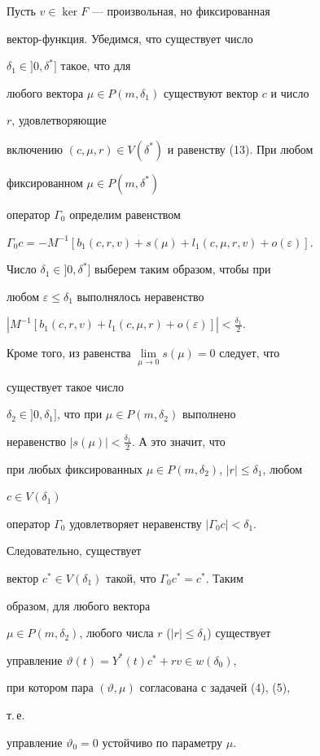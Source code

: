 \begin{pf} 


Пусть $v\in\ker F$ --- произвольная, но фиксированная 


вектор-функция. Убедимся, что существует число 


$\delta_1\in]0,\delta^*]$ такое, что для 


любого вектора $\mu\in P(m,\delta_1)$ существуют вектор $c$ и число 


$r$, удовлетворяющие 


включению $(c,\mu,r)\in V(\delta^*)$ и равенству (13). При любом 


фиксированном $\mu\in P(m,\delta^*)$ 


оператор $\Gamma_0$ определим равенством 


$\Gamma_0c=-M^{-1}[b_1(c,r,v)+s(\mu)+l_1(c,\mu,r,v)+o(\varepsilon)]$. 


Число $\delta_1\in]0,\delta^*]$ выберем таким образом, чтобы при 


любом $\varepsilon\le\delta_1$ выполнялось неравенство 


$|M^{-1}[b_1(c,r,v)+l_1(c,\mu,r)+o(\varepsilon)]|<\frac{\delta_1}{2}$. 


Кроме того, из равенства $\lim\limits_{\mu\to0}s(\mu)=0$ следует, что 


существует такое число 


$\delta_2\in]0,\delta_1]$, что при $\mu\in P(m,\delta_2)$ выполнено 


неравенство $|s(\mu)|<\frac{\delta_1}{2}$. А это значит, что 


при любых фиксированных $\mu\in P(m,\delta_2)$, $|r|\le\delta_1$, любом 


$c\in V(\delta_1)$ 


оператор $\Gamma_0$ удовлетворяет неравенству $|\Gamma_0c|<\delta_1$. 


Следовательно, существует 


вектор $c^*\in V(\delta_1)$ такой, что $\Gamma_0c^*=c^*$. Таким 


образом, для любого вектора 


$\mu\in P(m,\delta_2)$, любого числа $r$ ($|r|\le\delta_1$) существует 


управление $\vartheta(t)=Y^*(t)c^*+r v\in w(\delta_0)$, 


при котором пара $(\vartheta,\mu)$ согласована с задачей (4), (5), 


т.\,е. 


управление $\vartheta_0=0$ устойчиво по параметру $\mu$. 


\end{pf} 


